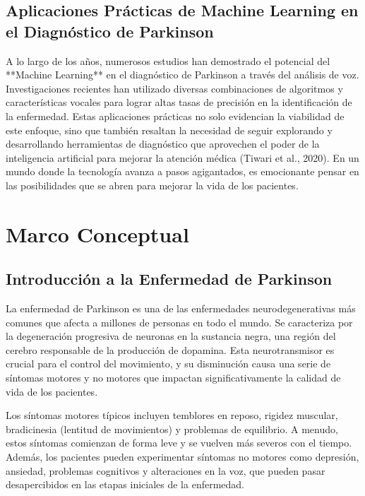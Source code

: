 \documentclass[listof=nochaptergap,12pt,times,authoryear]{report}
\begin{document}
\subsection{Aplicaciones Prácticas de Machine Learning en el Diagnóstico de Parkinson}
A lo largo de los años, numerosos estudios han demostrado el potencial del **Machine Learning** en el diagnóstico de Parkinson a través del análisis de voz. Investigaciones recientes han utilizado diversas combinaciones de algoritmos y características vocales para lograr altas tasas de precisión en la identificación de la enfermedad. Estas aplicaciones prácticas no solo evidencian la viabilidad de este enfoque, sino que también resaltan la necesidad de seguir explorando y desarrollando herramientas de diagnóstico que aprovechen el poder de la inteligencia artificial para mejorar la atención médica (Tiwari et al., 2020). En un mundo donde la tecnología avanza a pasos agigantados, es emocionante pensar en las posibilidades que se abren para mejorar la vida de los pacientes.



\section{Marco Conceptual}


\subsection{Introducción a la Enfermedad de Parkinson}

La enfermedad de Parkinson es una de las enfermedades neurodegenerativas más comunes que afecta a millones de personas en todo el mundo. Se caracteriza por la degeneración progresiva de neuronas en la sustancia negra, una región del cerebro responsable de la producción de dopamina. Esta neurotransmisor es crucial para el control del movimiento, y su disminución causa una serie de síntomas motores y no motores que impactan significativamente la calidad de vida de los pacientes.

Los síntomas motores típicos incluyen temblores en reposo, rigidez muscular, bradicinesia (lentitud de movimientos) y problemas de equilibrio. A menudo, estos síntomas comienzan de forma leve y se vuelven más severos con el tiempo. Además, los pacientes pueden experimentar síntomas no motores como depresión, ansiedad, problemas cognitivos y alteraciones en la voz, que pueden pasar desapercibidos en las etapas iniciales de la enfermedad.
\end{document}
